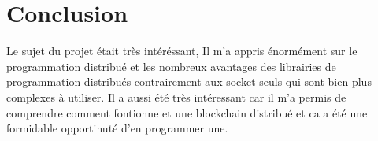 \documentclass[a4paper,11pt,DIV=12]{scrreprt}
\begin{document}
    \chapter{Conclusion}


    Le sujet du projet était très intéréssant, Il m'a  appris énormément sur le
    programmation distribué et les nombreux avantages des librairies de
    programmation distribués contrairement aux socket seuls qui sont bien plus
    complexes à utiliser. Il a aussi été très intéressant car il m'a permis de
    comprendre comment fontionne et une blockchain distribué et ca a été une
    formidable opportinuté d'en programmer une.
    
    

\end{document}
